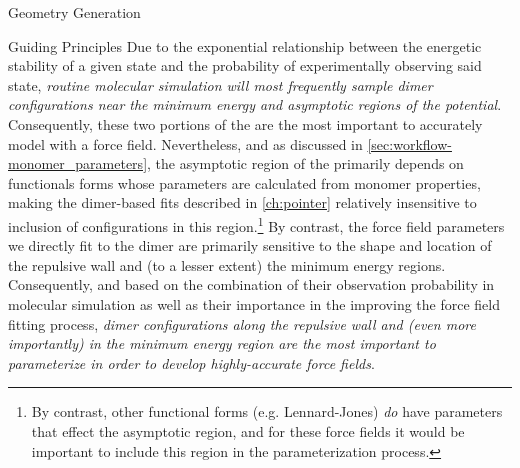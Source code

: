 \begin{section}{Geometry Generation}
\begin{subsection}{Guiding Principles}
Due to the exponential relationship between the energetic stability of a given
state and the probability of experimentally observing said state, \emph{routine molecular simulation will most frequently
sample dimer configurations near the minimum energy and asymptotic
regions of the potential}.\footnotemark{} Consequently,
these two portions of the \pes are the most important to accurately model with
a force field.
%
%
Nevertheless, and as discussed in \cref{sec:workflow-monomer_parameters}, the
asymptotic region of the \pes primarily depends on functionals forms whose
parameters are calculated from monomer properties, making 
the dimer-based fits described in \cref{ch:pointer} relatively insensitive to
inclusion of configurations in this %
region.\footnote{By contrast, other functional forms (e.g. Lennard-Jones) \emph{do}
have parameters that effect the asymptotic region, and for these force fields
it would be important to include this region in the parameterization process.}
%
By contrast, the force field parameters we directly fit to the dimer \pes are
primarily sensitive to the shape and location of
the repulsive wall and (to a lesser extent) the minimum energy
regions.
Consequently, and based on the combination of their observation probability in molecular
simulation as well as their importance in the improving the force field fitting process,
\emph{dimer configurations along the repulsive wall and (even more
importantly) in the minimum energy region are the
most important to parameterize in order to develop highly-accurate force fields}.\footnotemark{}




\end{subsection}
\end{section}
